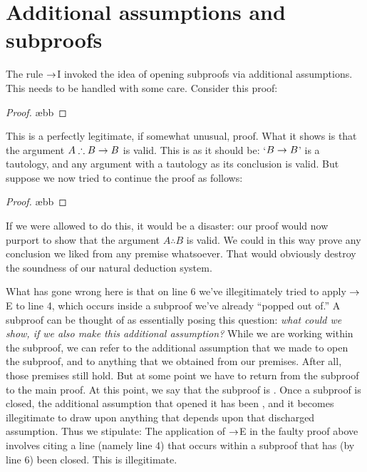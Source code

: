 \section{Additional assumptions and subproofs}
The rule $\rightarrow$I invoked the idea of opening subproofs via additional assumptions. This needs to be handled with some care. Consider this proof:
\begin{proof}
	\open
		 \ae{bb}
	\close
\end{proof}
This is a perfectly legitimate, if somewhat unusual, proof.  What it shows is that the argument $A \therefore B \rightarrow B$ is valid.  This is as it should be: `$B \rightarrow B$' is a tautology, and any argument with a tautology as its conclusion is valid.  But suppose we now tried to continue the proof as follows:
\begin{proof}
	\open
		 \ae{bb}
	\close
\end{proof}
If we were allowed to do this, it would be a disaster: our proof would now purport to show that the argument $A \therefore B$ is valid.   We could in this way prove any conclusion we liked from any premise whatsoever.  That would obviously destroy the soundness of our natural deduction system.

What has gone wrong here is that on line 6 we've illegitimately tried to apply $\rightarrow$E to line 4, which occurs inside a subproof we've already ``popped out of.''  A subproof can be thought of as essentially posing this question: \emph{what could we show, if we also make this additional assumption?}  While we are working within the subproof, we can refer to the additional assumption that we made to open the subproof, and to anything that we obtained from our premises. After all, those premises still hold. But at some point we have to return from the subproof to the main proof.  At this point, we say that the subproof is . Once a subproof is closed, the additional assumption that opened it has been , and it becomes illegitimate to draw upon anything that depends upon that discharged assumption. Thus we stipulate:
The application of $\rightarrow$E in the faulty proof above involves citing a line (namely line 4) that occurs within a subproof that has (by line 6) been closed. This is illegitimate. 

